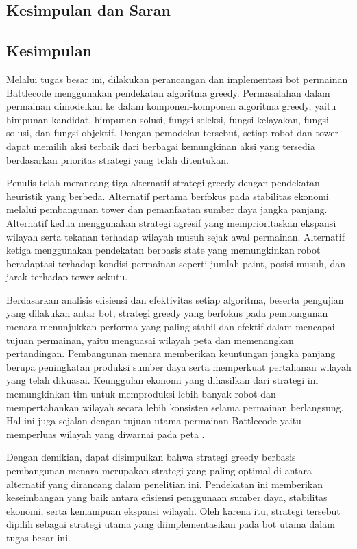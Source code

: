 \documentclass{article}
\begin{document}
\begin{enumerate}[label=\alph*.]
\medskip

\newpage
\section{Kesimpulan dan Saran}

\subsection{Kesimpulan}

Melalui tugas besar ini, dilakukan perancangan dan implementasi bot permainan Battlecode 
menggunakan pendekatan algoritma greedy. Permasalahan dalam permainan dimodelkan ke dalam 
komponen-komponen algoritma greedy, yaitu himpunan kandidat, himpunan solusi, fungsi seleksi, fungsi 
kelayakan, fungsi solusi, dan fungsi objektif. Dengan pemodelan tersebut, setiap robot dan tower dapat 
memilih aksi terbaik dari berbagai kemungkinan aksi yang tersedia berdasarkan prioritas strategi yang 
telah ditentukan.

Penulis telah merancang tiga alternatif strategi greedy dengan pendekatan heuristik yang berbeda. 
Alternatif pertama berfokus pada stabilitas ekonomi melalui pembangunan tower dan pemanfaatan 
sumber daya jangka panjang. Alternatif kedua menggunakan strategi agresif yang memprioritaskan 
ekspansi wilayah serta tekanan terhadap wilayah musuh sejak awal permainan. Alternatif ketiga 
menggunakan pendekatan berbasis state yang memungkinkan robot beradaptasi terhadap kondisi 
permainan seperti jumlah paint, posisi musuh, dan jarak terhadap tower sekutu.

Berdasarkan analisis efisiensi dan efektivitas setiap algoritma, beserta pengujian yang dilakukan antar bot, 
strategi greedy yang berfokus pada pembangunan menara menunjukkan performa yang paling stabil dan efektif dalam mencapai tujuan permainan, yaitu menguasai wilayah peta dan memenangkan pertandingan. 
Pembangunan menara memberikan keuntungan jangka panjang berupa peningkatan produksi sumber daya 
serta memperkuat pertahanan wilayah yang telah dikuasai. Keunggulan ekonomi yang dihasilkan dari 
strategi ini memungkinkan tim untuk memproduksi lebih banyak robot dan mempertahankan wilayah 
secara lebih konsisten selama permainan berlangsung. Hal ini juga sejalan dengan tujuan utama 
permainan Battlecode yaitu memperluas wilayah yang diwarnai pada peta .

Dengan demikian, dapat disimpulkan bahwa strategi greedy berbasis pembangunan menara merupakan 
strategi yang paling optimal di antara alternatif yang dirancang dalam penelitian ini. Pendekatan ini 
memberikan keseimbangan yang baik antara efisiensi penggunaan sumber daya, stabilitas ekonomi, serta 
kemampuan ekspansi wilayah. Oleh karena itu, strategi tersebut dipilih sebagai strategi utama yang 
diimplementasikan pada bot utama dalam tugas besar ini.


\end{enumerate}
\end{document}
